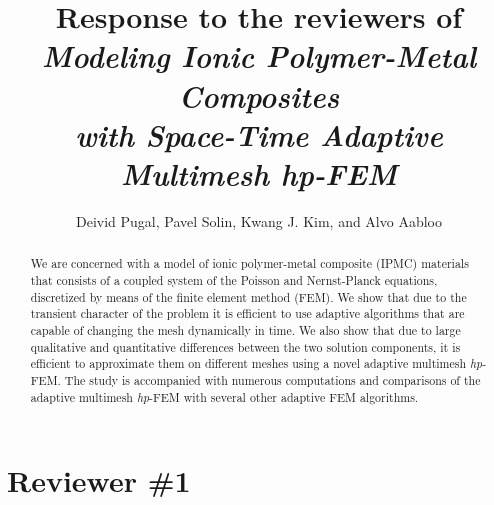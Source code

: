 \documentclass[mathpazo]{cicp}
\begin{document}
\title{Response to the reviewers of \emph{Modeling Ionic Polymer-Metal Composites\\ with Space-Time Adaptive Multimesh hp-FEM}}


\author[Deivid Pugal et.~al.]{Deivid Pugal\comma{},
Pavel Solin\comma{}\comma\corrauth,
Kwang J. Kim, and Alvo Aabloo}

\address{\ Mechanical Engineering Department, University of Nevada, Reno, NV, U.S.A.\\
\ Department of Mathematics and Statistics, University of Nevada, Reno, NV, U.S.A.\\
\ Institute of Thermomechanics, Prague, Czech Republic\\
\ Institute of Technology, Tartu University, Estonia}



\begin{abstract}
We are concerned with a model of ionic polymer-metal composite (IPMC) materials
that consists of a coupled system of the Poisson and Nernst-Planck equations, 
discretized by means of the finite element method (FEM). We show that due to the 
transient character of the problem it is efficient to use adaptive algorithms 
that are capable of changing the mesh dynamically in time. We also show 
that due to large qualitative and quantitative differences between the 
two solution components, it is efficient to approximate them on different 
meshes using a novel adaptive multimesh \emph{hp}-FEM. The study is 
accompanied with numerous computations and comparisons of the adaptive 
multimesh \emph{hp}-FEM with several other adaptive FEM algorithms. 
\end{abstract}

\maketitle


\section{Reviewer \#1}
\end{document}
